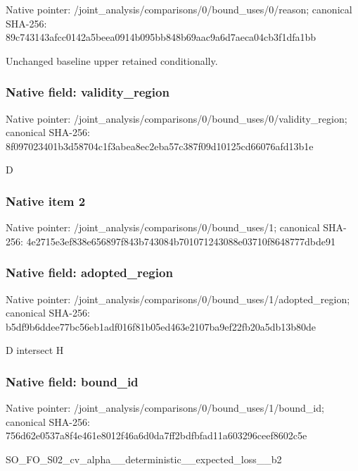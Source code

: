 \documentclass[10pt,a4paper]{article}
\begin{document}
Native pointer: /joint\_analysis/comparis\allowbreak{}ons/0/bound\_uses/0/reaso\allowbreak{}n; canonical SHA-256: 89c743143afcc0142a5beea0\allowbreak{}914b095bb848b69aac9a6d7a\allowbreak{}eca04cb3f1dfa1bb


Unchanged baseline upper retained conditionally.


\subsubsection{Native field: validity\_region}


Native pointer: /joint\_analysis/comparis\allowbreak{}ons/0/bound\_uses/0/valid\allowbreak{}ity\_region; canonical SHA-256: 8f097023401b3d58704c1f3a\allowbreak{}bea8ec2eba57c387f09d1012\allowbreak{}5cd66076afd13b1e


D


\subsubsection{Native item 2}


Native pointer: /joint\_analysis/comparis\allowbreak{}ons/0/bound\_uses/1; canonical SHA-256: 4e2715e3ef838e656897f843\allowbreak{}b743084b701071243088e037\allowbreak{}10f8648777dbde91



\subsubsection{Native field: adopted\_region}


Native pointer: /joint\_analysis/comparis\allowbreak{}ons/0/bound\_uses/1/adopt\allowbreak{}ed\_region; canonical SHA-256: b5df9b6ddee77bc56eb1adf0\allowbreak{}16f81b05ed463e2107ba9ef2\allowbreak{}2fb20a5db13b80de


D intersect H


\subsubsection{Native field: bound\_id}


Native pointer: /joint\_analysis/comparis\allowbreak{}ons/0/bound\_uses/1/bound\allowbreak{}\_id; canonical SHA-256: 756d62e0537a8f4e461e8012\allowbreak{}f46a6d0da7ff2bdfbfad11a6\allowbreak{}03296ceef8602c5e


SO\_FO\_S02\_cv\_alpha\_\_dete\allowbreak{}rministic\_\_expected\_loss\allowbreak{}\_\_b2
\end{document}
